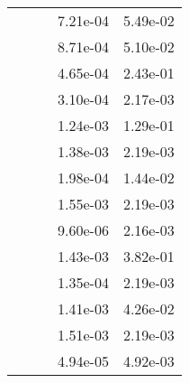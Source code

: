 \begin{table}
\begin{tabular}{c|cc|cc|}
\multicolumn{1}{|c|}{} & \multicolumn{1}{|c|}{} & \multicolumn{1}{|c|}{} & \multicolumn{1}{|c|}{  7.21e-04} & \multicolumn{1}{|c|}{  5.49e-02} \\ 
\multicolumn{1}{|c|}{} & \multicolumn{1}{|c|}{} & \multicolumn{1}{|c|}{} & \multicolumn{1}{|c|}{  8.71e-04} & \multicolumn{1}{|c|}{  5.10e-02} \\ 
\multicolumn{1}{|c|}{} & \multicolumn{1}{|c|}{} & \multicolumn{1}{|c|}{} & \multicolumn{1}{|c|}{  4.65e-04} & \multicolumn{1}{|c|}{  2.43e-01} \\ 
\multicolumn{1}{|c|}{} & \multicolumn{1}{|c|}{} & \multicolumn{1}{|c|}{} & \multicolumn{1}{|c|}{  3.10e-04} & \multicolumn{1}{|c|}{  2.17e-03} \\ 
\multicolumn{1}{|c|}{} & \multicolumn{1}{|c|}{} & \multicolumn{1}{|c|}{} & \multicolumn{1}{|c|}{  1.24e-03} & \multicolumn{1}{|c|}{  1.29e-01} \\ 
\multicolumn{1}{|c|}{} & \multicolumn{1}{|c|}{} & \multicolumn{1}{|c|}{} & \multicolumn{1}{|c|}{  1.38e-03} & \multicolumn{1}{|c|}{  2.19e-03} \\ 
\multicolumn{1}{|c|}{} & \multicolumn{1}{|c|}{} & \multicolumn{1}{|c|}{} & \multicolumn{1}{|c|}{  1.98e-04} & \multicolumn{1}{|c|}{  1.44e-02} \\ 
\multicolumn{1}{|c|}{} & \multicolumn{1}{|c|}{} & \multicolumn{1}{|c|}{} & \multicolumn{1}{|c|}{  1.55e-03} & \multicolumn{1}{|c|}{  2.19e-03} \\ 
\multicolumn{1}{|c|}{} & \multicolumn{1}{|c|}{} & \multicolumn{1}{|c|}{} & \multicolumn{1}{|c|}{  9.60e-06} & \multicolumn{1}{|c|}{  2.16e-03} \\ 
\multicolumn{1}{|c|}{} & \multicolumn{1}{|c|}{} & \multicolumn{1}{|c|}{} & \multicolumn{1}{|c|}{  1.43e-03} & \multicolumn{1}{|c|}{  3.82e-01} \\ 
\multicolumn{1}{|c|}{} & \multicolumn{1}{|c|}{} & \multicolumn{1}{|c|}{} & \multicolumn{1}{|c|}{  1.35e-04} & \multicolumn{1}{|c|}{  2.19e-03} \\ 
\multicolumn{1}{|c|}{} & \multicolumn{1}{|c|}{} & \multicolumn{1}{|c|}{} & \multicolumn{1}{|c|}{  1.41e-03} & \multicolumn{1}{|c|}{  4.26e-02} \\ 
\multicolumn{1}{|c|}{} & \multicolumn{1}{|c|}{} & \multicolumn{1}{|c|}{} & \multicolumn{1}{|c|}{  1.51e-03} & \multicolumn{1}{|c|}{  2.19e-03} \\ 
\multicolumn{1}{|c|}{} & \multicolumn{1}{|c|}{} & \multicolumn{1}{|c|}{} & \multicolumn{1}{|c|}{  4.94e-05} & \multicolumn{1}{|c|}{  4.92e-03} \\ 

\end{tabular}
\end{table}

